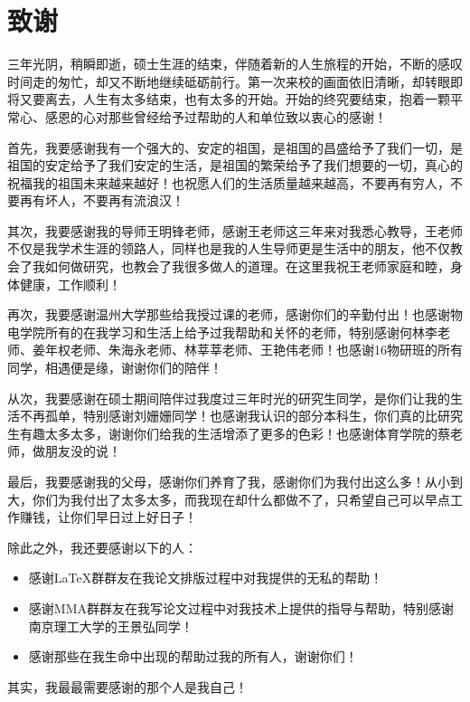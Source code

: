 
\chapter[致谢]{致\quad 谢}
\vbox{}

三年光阴，稍瞬即逝，硕士生涯的结束，伴随着新的人生旅程的开始，不断的感叹时间走的匆忙，却又不断地继续砥砺前行。第一次来校的画面依旧清晰，却转眼即将又要离去，人生有太多结束，也有太多的开始。开始的终究要结束，抱着一颗平常心、感恩的心对那些曾经给予过帮助的人和单位致以衷心的感谢！

首先，我要感谢我有一个强大的、安定的祖国，是祖国的昌盛给予了我们一切，是祖国的安定给予了我们安定的生活，是祖国的繁荣给予了我们想要的一切，真心的祝福我的祖国未来越来越好！也祝愿人们的生活质量越来越高，不要再有穷人，不要再有坏人，不要再有流浪汉！

其次，我要感谢我的导师王明锋老师，感谢王老师这三年来对我悉心教导，王老师不仅是我学术生涯的领路人，同样也是我的人生导师更是生活中的朋友，他不仅教会了我如何做研究，也教会了我很多做人的道理。在这里我祝王老师家庭和睦，身体健康，工作顺利！

再次，我要感谢温州大学那些给我授过课的老师，感谢你们的辛勤付出！也感谢物电学院所有的在我学习和生活上给予过我帮助和关怀的老师，特别感谢何林李老师、姜年权老师、朱海永老师、林莘莘老师、王艳伟老师！也感谢16物研班的所有同学，相遇便是缘，谢谢你们的陪伴！

从次，我要感谢在硕士期间陪伴过我度过三年时光的研究生同学，是你们让我的生活不再孤单，特别感谢刘姗姗同学！也感谢我认识的部分本科生，你们真的比研究生有趣太多太多，谢谢你们给我的生活增添了更多的色彩！也感谢体育学院的蔡老师，做朋友没的说！

最后，我要感谢我的父母，感谢你们养育了我，感谢你们为我付出这么多！从小到大，你们为我付出了太多太多，而我现在却什么都做不了，只希望自己可以早点工作赚钱，让你们早日过上好日子！

除此之外，我还要感谢以下的人：
\begin{itemize}[itemsep=0pt,topsep=0pt]
	\item 感谢LaTeX群群友在我论文排版过程中对我提供的无私的帮助！
	\item 感谢MMA群群友在我写论文过程中对我技术上提供的指导与帮助，特别感谢南京理工大学的王景弘同学！
	\item 感谢那些在我生命中出现的帮助过我的所有人，谢谢你们！
\end{itemize}

其实，我最最需要感谢的那个人是我自己！

